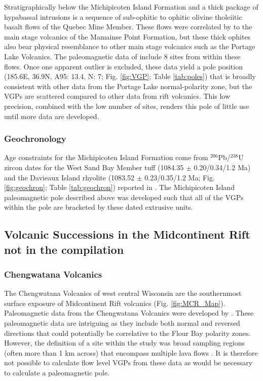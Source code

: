 \documentclass[11pt,letterpaper]{article}
\begin{document}
Stratigraphically below the Michipicoten Island Formation and a thick package of hypabassal intrusions is a sequence of sub-ophitic to ophitic olivine tholeiitic basalt flows of the Quebec Mine Member. These flows were correlated by \cite{Annells1974a} to the main stage volcanics of the Mamainse Point Formation, but these thick ophites also bear physical resemblance to other main stage volcanics such as the Portage Lake Volcanics. The paleomagnetic data of \cite{Palmer1987a} include 8 sites from within these flows. Once one apparent outlier is excluded, these data yield a pole position (185.6\textdegree E, 36.9\textdegree N, A95: 13.4\textdegree, N: 7; Fig. \ref{fig:VGP}; Table \ref{tab:poles}) that is broadly consistent with other data from the Portage Lake normal-polarity zone, but the VGPs are scattered compared to other data from rift volcanics. This low precision, combined with the low number of sites, renders this pole of little use until more data are developed.

\subsubsection{Geochronology}

Age constraints for the Michipicoten Island Formation come from $^{206}$Pb/$^{238}$U zircon dates for the West Sand Bay Member tuff (1084.35 $\pm$ 0.20/0.34/1.2 Ma) and the Davieaux Island rhyolite (1083.52 $\pm$ 0.23/0.35/1.2 Ma; Fig. \ref{fig:geochron}; Table \ref{tab:geochron}) reported in \cite{Fairchild2017a}. The Michipicoten Island paleomagnetic pole described above was developed such that all of the VGPs within the pole are bracketed by these dated extrusive units.

\subsection{Volcanic Successions in the Midcontinent Rift not in the compilation}

\subsubsection{Chengwatana Volcanics}

The Chengwatana Volcanics of west central Wisconsin are the southernmost surface exposure of Midcontinent Rift volcanics (Fig. \ref{fig:MCR_Map}). Paleomagnetic data from the Chengwatana Volcanics were developed by \cite{Kean1997a}. These paleomagnetic data are intriguing as they include both normal and reversed directions that could potentially be correlative to the Flour Bay polarity zones. However, the definition of a site within the study was broad sampling regions (often more than 1 km across) that encompass multiple lava flows \citep{Kean1997a}. It is therefore not possible to calculate flow level VGPs from these data as would be necessary to calculate a paleomagnetic pole.
\end{document}
